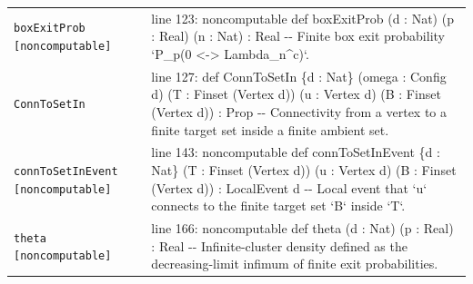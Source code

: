 \documentclass[10pt]{article}
\begin{document}
\begin{longtable}{>{\raggedright\arraybackslash}p{} >{\raggedright\arraybackslash}p{}}
\texttt{boxExitProb [noncomputable]} & {\ttfamily\scriptsize line 123:\allowbreak{} noncomputable def boxExitProb (\allowbreak{}d :\allowbreak{} Nat)\allowbreak{} (\allowbreak{}p :\allowbreak{} Real)\allowbreak{} (\allowbreak{}n :\allowbreak{} Nat)\allowbreak{} :\allowbreak{} Real -\allowbreak{}-\allowbreak{} Finite box exit probability `P\_\allowbreak{}p(\allowbreak{}0 <-\allowbreak{}> Lambda\_\allowbreak{}n\textasciicircum{}c)\allowbreak{}`.\allowbreak{}} \\[0.45em]
\texttt{ConnToSetIn} & {\ttfamily\scriptsize line 127:\allowbreak{} def ConnToSetIn \{d :\allowbreak{} Nat\} (\allowbreak{}omega :\allowbreak{} Config d)\allowbreak{} (\allowbreak{}T :\allowbreak{} Finset (\allowbreak{}Vertex d)\allowbreak{})\allowbreak{} (\allowbreak{}u :\allowbreak{} Vertex d)\allowbreak{} (\allowbreak{}B :\allowbreak{} Finset (\allowbreak{}Vertex d)\allowbreak{})\allowbreak{} :\allowbreak{} Prop -\allowbreak{}-\allowbreak{} Connectivity from a vertex to a finite target set inside a finite ambient set.\allowbreak{}} \\[0.45em]
\texttt{connToSetInEvent [noncomputable]} & {\ttfamily\scriptsize line 143:\allowbreak{} noncomputable def connToSetInEvent \{d :\allowbreak{} Nat\} (\allowbreak{}T :\allowbreak{} Finset (\allowbreak{}Vertex d)\allowbreak{})\allowbreak{} (\allowbreak{}u :\allowbreak{} Vertex d)\allowbreak{} (\allowbreak{}B :\allowbreak{} Finset (\allowbreak{}Vertex d)\allowbreak{})\allowbreak{} :\allowbreak{} LocalEvent d -\allowbreak{}-\allowbreak{} Local event that `u` connects to the finite target set `B` inside `T`.\allowbreak{}} \\[0.45em]
\texttt{theta [noncomputable]} & {\ttfamily\scriptsize line 166:\allowbreak{} noncomputable def theta (\allowbreak{}d :\allowbreak{} Nat)\allowbreak{} (\allowbreak{}p :\allowbreak{} Real)\allowbreak{} :\allowbreak{} Real -\allowbreak{}-\allowbreak{} Infinite-\allowbreak{}cluster density defined as the decreasing-\allowbreak{}limit infimum of finite exit probabilities.\allowbreak{}} \\[0.45em]
\end{longtable}
\end{document}
